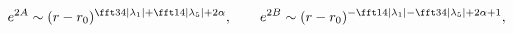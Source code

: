 \begin{equation}
e^{2A}\sim(r-r_0)^{\fft34|\lambda_1|+\fft14|\lambda_5|+2\alpha},\qquad
e^{2B}\sim(r-r_0)^{-\fft14|\lambda_1|-\fft34|\lambda_5|+2\alpha+1},
\end{equation}

